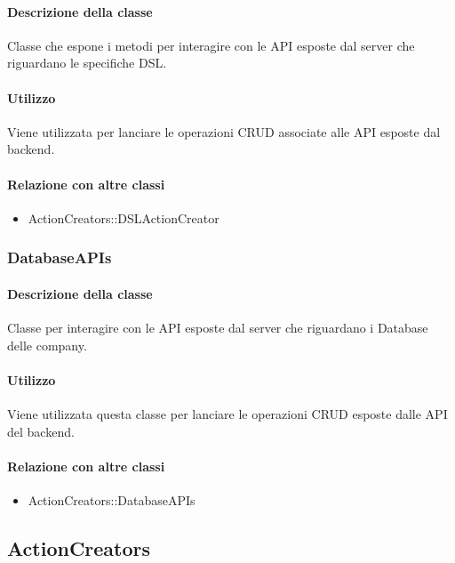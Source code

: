 \paragraph*{Descrizione della classe}
Classe che espone i metodi per interagire con le API esposte dal server che riguardano le specifiche DSL.

\paragraph*{Utilizzo}
Viene utilizzata per lanciare le operazioni CRUD associate alle API esposte dal backend.

\paragraph*{Relazione con altre classi}
\begin{itemize}
\item ActionCreators::DSLActionCreator
\end{itemize}

\subsubsection{DatabaseAPIs}
\paragraph*{Descrizione della classe}
Classe per interagire con le API esposte dal server che riguardano i Database delle company.

\paragraph*{Utilizzo}
Viene utilizzata questa classe per lanciare le operazioni CRUD esposte dalle API del backend.

\paragraph*{Relazione con altre classi}
\begin{itemize}
\item ActionCreators::DatabaseAPIs
\end{itemize}


\subsection{ActionCreators}

